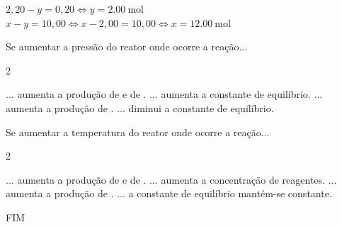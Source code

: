 \documentclass[addpoints]{exam}
\begin{document}
\begin{questions}
\begin{solution}
{				$2,20 - y = 0,20 \Leftrightarrow y = \SI{2,00}{\mole}$\\
				$x-y=10,00 \Leftrightarrow x-2,00=10,00 \Leftrightarrow x = \SI{12,00}{\mole}$
			}
		\end{solution}
		
		\vspace{5pt}
		\question[8] Se aumentar a pressão do reator onde ocorre a reação...
		
		\begin{multicols}{2}
			\begin{choices}
				\choice $\ldots$ aumenta a produção de  e de .
				\choice $\ldots$ aumenta a constante de equilíbrio.
				\correctchoice $\ldots$ aumenta a produção de .
				\choice $\ldots$ diminui a constante de equilíbrio.
			\end{choices}
		\end{multicols}
		
		\vspace{5pt}
		\question[8] Se aumentar a temperatura do reator onde ocorre a reação...
		
		\begin{multicols}{2}
			\begin{choices}
				\choice $\ldots$ aumenta a produção de  e de \ce{Cl2}.
				\choice $\ldots$ aumenta a concentração de reagentes.
				\correctchoice $\ldots$ aumenta a produção de \ce{PCl5}.
				\choice $\ldots$ a constante de equilíbrio mantém-se constante.
			\end{choices}
		\end{multicols}
		
	\end{questions}
	
	\vspace{3pt}
	\center
	FIM
	
	\vfill
	\center
	\pointtable[h]
\end{document}
